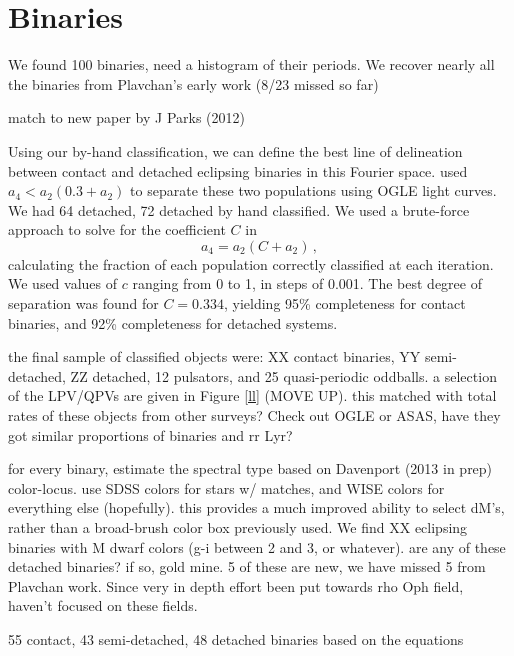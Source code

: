 \documentclass[]{emulateapj}
\begin{document}
\section{Binaries}
We found 100 binaries, need a histogram of their periods. We recover nearly all the binaries from Plavchan's early work (8/23 missed so far)

match to new paper by J Parks (2012)




Using our by-hand classification, we can define the best line of delineation between contact and detached eclipsing binaries in this Fourier space. \citet{rucinski1997b} used $a_4< a_2(0.3 + a_2)$ to separate these two populations using OGLE light curves. We had 64 detached, 72 detached by hand classified. We used a brute-force approach to solve for the coefficient $C$ in 
\begin{equation}
a_4 = a_2(C + a_2)\,,
\end{equation}
calculating the fraction of each population correctly classified at each iteration. We used values of $c$ ranging from 0 to 1, in steps of 0.001. The best degree of separation was found for $C=0.334$, yielding 95\% completeness for contact binaries, and 92\% completeness for detached systems.


the final sample of classified objects were: XX contact binaries, YY semi-detached, ZZ detached, 12 pulsators, and 25 quasi-periodic oddballs. a selection of the LPV/QPVs are given in Figure \ref{ll} (MOVE UP). this matched with total rates of these objects from other surveys? Check out OGLE or ASAS, have they got similar proportions of binaries and rr Lyr?




for every binary, estimate the spectral type based on Davenport (2013 in prep) color-locus. use SDSS colors for stars w/ matches, and WISE colors for everything else (hopefully). this provides a much improved ability to select dM's, rather than a broad-brush color box previously used. We find XX eclipsing binaries with M dwarf colors (g-i between 2 and 3, or whatever). are any of these detached binaries? if so, gold mine. 5 of these are new, we have missed 5 from Plavchan work. Since very in depth effort been put towards rho Oph field, haven't focused on these fields.

55 contact, 43 semi-detached, 48 detached binaries based on the equations
\end{document}

